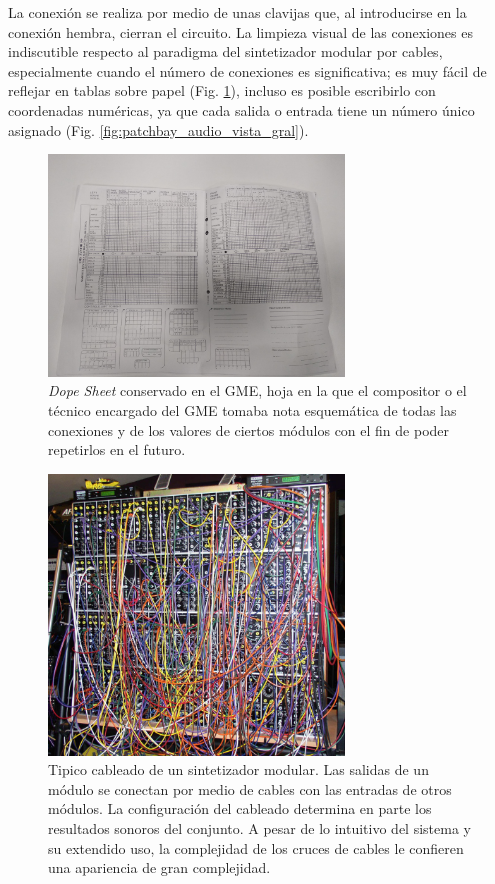 La conexión se realiza por medio de unas clavijas que, al introducirse en la conexión hembra, cierran el circuito. La limpieza visual de las conexiones es indiscutible respecto al paradigma del sintetizador modular por cables, especialmente cuando el número de conexiones es significativa; es muy fácil de reflejar en tablas sobre papel (Fig. \ref{fig:dope_sheet_GME}), incluso es posible escribirlo con coordenadas numéricas, ya que cada salida o entrada tiene un número único asignado (Fig. \ref{fig:patchbay_audio_vista_gral}).

\begin{figure}
	\centering
	\includegraphics[width=0.7\textwidth]{images/dope_sheet_GME}
	\caption[\textit{Dope Sheet} conservado en el GME]{\textit{Dope Sheet} conservado en el GME, hoja en la que el compositor o el técnico encargado del GME tomaba nota esquemática de todas las conexiones y de los valores de ciertos módulos con el fin de poder repetirlos en el futuro.}
	\label{fig:dope_sheet_GME}
\end{figure}

\begin{figure}
	\centering
	\includegraphics[width=0.7\textwidth]{images/sinte_modular}
	\caption[Tipico cableado de un sintetizador modular]{Tipico cableado de un sintetizador modular. Las salidas de un módulo se conectan por medio de cables con las entradas de otros módulos. La configuración del cableado determina en parte los resultados sonoros del conjunto. A pesar de lo intuitivo del sistema y su extendido uso, la complejidad de los cruces de cables le confieren una apariencia de gran complejidad.}
	\label{fig:sintetizador_modular}
\end{figure}

